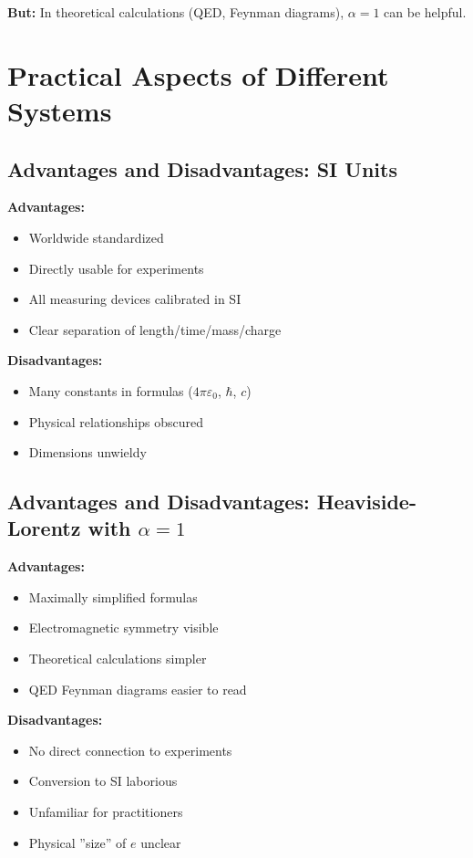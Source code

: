 	\textbf{But:} In theoretical calculations (QED, Feynman diagrams), $\alpha = 1$ can be helpful.
	
	\section{Practical Aspects of Different Systems}
	
	\subsection{Advantages and Disadvantages: SI Units}
	
	\textbf{Advantages:}
	\begin{itemize}
		\item Worldwide standardized
		\item Directly usable for experiments
		\item All measuring devices calibrated in SI
		\item Clear separation of length/time/mass/charge
	\end{itemize}
	
	\textbf{Disadvantages:}
	\begin{itemize}
		\item Many constants in formulas ($4\pi\varepsilon_0$, $\hbar$, $c$)
		\item Physical relationships obscured
		\item Dimensions unwieldy
	\end{itemize}
	
	\subsection{Advantages and Disadvantages: Heaviside-Lorentz with $\alpha = 1$}
	
	\textbf{Advantages:}
	\begin{itemize}
		\item Maximally simplified formulas
		\item Electromagnetic symmetry visible
		\item Theoretical calculations simpler
		\item QED Feynman diagrams easier to read
	\end{itemize}
	
	\textbf{Disadvantages:}
	\begin{itemize}
		\item No direct connection to experiments
		\item Conversion to SI laborious
		\item Unfamiliar for practitioners
		\item Physical ''size'' of $e$ unclear
	\end{itemize}
	
